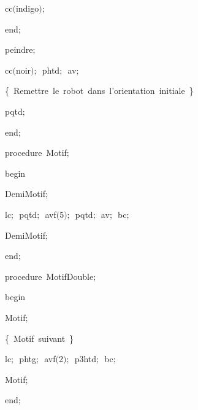 {\vspace{\neglskip}\mbox{\blc  \blk\blk\blk\blk\idt  cc$($indigo$)$$;$}\par 
\vspace{\neglskip}\mbox{\blc  \blk\blk\blk\idt  \mcl end\idt $;$}\par 
\vspace{\neglskip}\mbox{\blc  \blk\blk\idt  peindre$;$}\par 
\vspace{\neglskip}\mbox{\blc  \blk\blk\idt  cc$($noir$)$$;$\ phtd$;$\ av$;$}\par 
\vspace{\neglskip}\mbox{\blc  \blk\idt  \cmt  \{\ Remettre\ le\ robot\ dans\ l{'}orientation\ initiale\ \}\idt \ \ }\par 
\vspace{\neglskip}\mbox{\blc  \blk\idt  pqtd$;$\ }\par 
\vspace{\neglskip}\mbox{\blc  \idt  \mcl end\idt $;$}\par 
\medskip

\pagebreak[3] 
\vspace{\neglskip}\mbox{\blc  \blk\idt  \mcl procedure\idt \ Motif$;$}\par 
\vspace{\neglskip}\mbox{\blc  \blk\idt  \mcl begin\idt }\par 
\vspace{\neglskip}\mbox{\blc  \blk\blk\idt  DemiMotif$;$\ }\par 
\vspace{\neglskip}\mbox{\blc  \blk\blk\idt  lc$;$\ pqtd$;$\ avf$($5$)$$;$\ pqtd$;$\ av$;$\ bc$;$}\par 
\vspace{\neglskip}\mbox{\blc  \blk\blk\idt  DemiMotif$;$}\par 
\vspace{\neglskip}\mbox{\blc  \blk\idt  \mcl end\idt $;$}\par 
\medskip

\pagebreak[3] 
\vspace{\neglskip}\mbox{\blc  \blk\idt  \mcl procedure\idt \ MotifDouble$;$}\par 
\vspace{\neglskip}\mbox{\blc  \blk\idt  \mcl begin\idt }\par 
\vspace{\neglskip}\mbox{\blc  \blk\blk\idt  Motif$;$\ }\par 
\vspace{\neglskip}\mbox{\blc  \blk\blk\idt  \cmt  \{\ Motif\ suivant\ \}\idt \ }\par 
\vspace{\neglskip}\mbox{\blc  \blk\blk\idt  lc$;$\ phtg$;$\ avf$($2$)$$;$\ p3htd$;$\ bc$;$}\par 
\vspace{\neglskip}\mbox{\blc  \blk\blk\idt  Motif$;$}\par 
\vspace{\neglskip}\mbox{\blc  \blk\idt  \mcl end\idt $;$}\par 
\medskip

}

